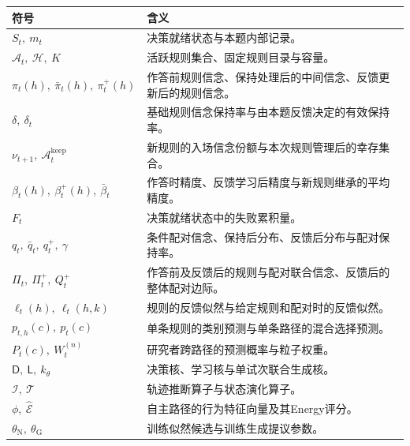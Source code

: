 \documentclass[11pt,a4paper]{article}
\numberwithin{equation}{section}
\newcommand{\A}{\mathcal{A}}
\newcommand{\Hh}{\mathcal{H}}
\newcommand{\Dd}{\mathsf{D}}
\newcommand{\Ll}{\mathsf{L}}
\newcommand{\Ii}{\mathcal{I}}
\newcommand{\Tt}{\mathcal{T}}
\begin{document}
{\small
\begin{longtable}{L{3.0cm}L{11.5cm}}
\toprule
符号 & 含义\\
\midrule\endhead
$S_t,\ m_t$ & 决策就绪状态与本题内部记录。\\
$\A_t,\ \Hh,\ K$ & 活跃规则集合、固定规则目录与容量。\\

$\pi_t(h),\ \bar\pi_t(h),\ \pi_t^+(h)$ & 作答前规则信念、保持处理后的中间信念、反馈更新后的规则信念。\\
$\delta,\ \delta_t$ & 基础规则信念保持率与由本题反馈决定的有效保持率。\\
$\nu_{t+1},\ \A_t^{\mathrm{keep}}$ & 新规则的入场信念份额与本次规则管理后的幸存集合。\\
$\beta_t(h),\ \beta_t^+(h),\ \bar\beta_t$ & 作答时精度、反馈学习后精度与新规则继承的平均精度。\\
$F_t$ & 决策就绪状态中的失败累积量。\\
$q_t,\ \bar q_t,\ q_t^+,\ \gamma$ & 条件配对信念、保持后分布、反馈后分布与配对保持率。\\
$\Pi_t,\ \Pi_t^+,\ Q_t^+$ & 作答前及反馈后的规则与配对联合信念、反馈后的整体配对边际。\\
$\ell_t(h),\ \ell_t(h,k)$ & 规则的反馈似然与给定规则和配对时的反馈似然。\\
$p_{t,h}(c),\ p_t(c)$ & 单条规则的类别预测与单条路径的混合选择预测。\\
$P_t(c),\ W_t^{(n)}$ & 研究者跨路径的预测概率与粒子权重。\\
$\Dd,\ \Ll,\ k_\theta$ & 决策核、学习核与单试次联合生成核。\\
$\Ii,\ \Tt$ & 轨迹推断算子与状态演化算子。\\
$\phi,\ \widehat{\mathcal E}$ & 自主路径的行为特征向量及其Energy评分。\\
$\theta_{\mathrm N},\ \theta_{\mathrm G}$ & 训练似然候选与训练生成提议参数。\\

\bottomrule
\end{longtable}}
\end{document}
